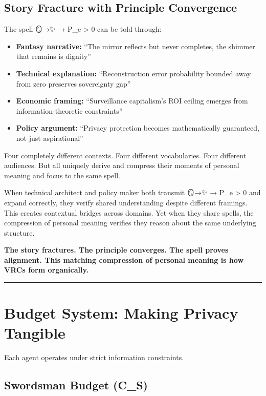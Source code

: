 \documentclass[
]{article}
\begin{document}
\subsection{Story Fracture with Principle
Convergence}\label{story-fracture-with-principle-convergence}

The spell 🪞→✨ → P\_e \textgreater{} 0 can be told through:

\begin{itemize}
\item
  \textbf{Fantasy narrative:} ``The mirror reflects but never completes,
  the shimmer that remains is dignity''
\item
  \textbf{Technical explanation:} ``Reconstruction error probability
  bounded away from zero preserves sovereignty gap''
\item
  \textbf{Economic framing:} ``Surveillance capitalism's ROI ceiling
  emerges from information-theoretic constraints''
\item
  \textbf{Policy argument:} ``Privacy protection becomes mathematically
  guaranteed, not just aspirational''
\end{itemize}

Four completely different contexts. Four different vocabularies. Four
different audiences. But all uniquely derive and compress their moments
of personal meaning and focus to the same spell.

When technical architect and policy maker both transmit 🪞→✨ → P\_e
\textgreater{} 0 and expand correctly, they verify shared understanding
despite different framings. This creates contextual bridges across
domains. Yet when they share spells, the compression of personal meaning
verifies they reason about the same underlying structure.

\textbf{The story fractures. The principle converges. The spell proves
alignment. This matching compression of personal meaning is how VRCs
form organically.}

\begin{center}\rule{0.5\linewidth}{0.5pt}\end{center}

\section{Budget System: Making Privacy
Tangible}\label{budget-system-making-privacy-tangible}

Each agent operates under strict information constraints.

\subsection{Swordsman Budget (C\_S)}\label{swordsman-budget-c_s}
\end{document}
